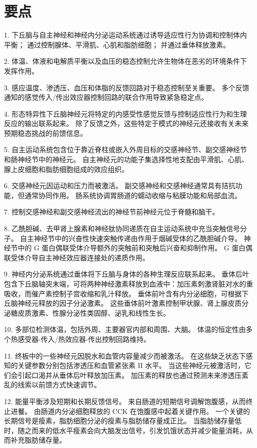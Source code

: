 \section{要点}
1. 下丘脑与自主神经和神经内分泌运动系统通过诱导适应性行为协调和控制体内平衡； 通过控制腺体、平滑肌、心肌和脂肪细胞； 并通过垂体释放激素。 

2. 体温、体液和电解质平衡以及血压的稳态控制允许生物体在恶劣的环境条件下发挥作用。 

3. 感应温度、渗透压、血压和体脂的反馈回路对于稳态控制至关重要。 多个反馈通知的感觉传入/传出效应器控制回路的联合作用导致紧急稳定点。 

4. 形态特异性下丘脑神经元将特定的内感受性感觉反馈与控制适应性行为和生理反应的输出联系起来。 除了反馈之外，这些特定于模式的神经元还接收有关未来预期稳态挑战的前馈信息。 

5. 自主运动系统包含位于靠近脊柱或嵌入外周目标的交感神经节、副交感神经节和肠神经节中的神经元。 自主神经元的功能子集选择性地支配由平滑肌、心肌、腺上皮细胞和脂肪细胞组成的效应组织。 

6. 交感神经元因运动和压力而被激活。 副交感神经和交感神经通常具有拮抗功能，但通常协同作用。 肠系统协调胃肠道的蠕动收缩与粘膜功能和局部血流。 

7. 控制交感神经和副交感神经流出的神经节前神经元位于脊髓和脑干。 

8. 乙酰胆碱、去甲肾上腺素和神经肽协同递质在自主运动系统中充当突触信号分子。 自主神经节中的兴奋性快速突触传递由作用于烟碱受体的乙酰胆碱介导。 神经节中的 G 蛋白偶联受体介导额外的突触前和突触后兴奋和抑制作用。 G 蛋白偶联受体介导自主神经效应器连接处的递质作用。 

9. 神经内分泌系统通过垂体将下丘脑与身体的各种生理反应联系起来。 垂体后叶包含下丘脑轴突末端，可将两种神经激素释放到血液中：加压素刺激肾脏对水的重吸收，而催产素控制子宫收缩和乳汁释放。 垂体前叶含有内分泌细胞，可根据下丘脑神经元释放的因子分泌激素。 这些垂体前叶激素控制甲状腺、肾上腺皮质分泌糖皮质激素、性腺分泌性类固醇、泌乳和线性生长。

10. 多部位检测体温，包括外周、主要器官内部和周围、大脑。 体温的恒定性由多个热感受器-传入/热效应器-传出控制回路维持。 

11. 终板中的一些神经元因脱水和血管内容量减少而被激活。 在这些缺乏状态下感知的关键参数分别包括渗透压和血管紧张素 II 水平。 当这些神经元被激活时，它们会引起口渴并从垂体后叶释放加压素。 加压素的释放也通过预测未来渗透压紊乱的线索以前馈方式快速调节。 

12. 能量平衡涉及短期和长期反馈信号。 来自肠道的短期信号调解饱腹感，从而终止进餐。 由肠道内分泌细胞释放的 CCK 在饱腹感中起着关键作用。 一个关键的长期信号是瘦素，脂肪细胞分泌的瘦素与脂肪储存量成正比。 当脂肪储存量低时，随之而来的低水平瘦素会向大脑发出信号，引发饥饿状态并减少能量消耗，从而补充脂肪储存量。 

